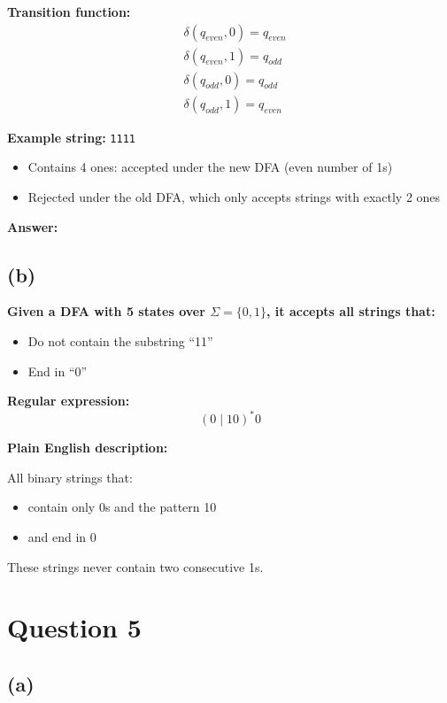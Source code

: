 \documentclass{article}
\begin{document}
\textbf{Transition function:}
\[
\begin{aligned}
&\delta(q_{even}, 0) = q_{even} \\
&\delta(q_{even}, 1) = q_{odd} \\
&\delta(q_{odd}, 0) = q_{odd} \\
&\delta(q_{odd}, 1) = q_{even}
\end{aligned}
\]

\textbf{Example string:} \texttt{1111}

\begin{itemize}
  \item Contains 4 ones: accepted under the new DFA (even number of 1s)
  \item Rejected under the old DFA, which only accepts strings with exactly 2 ones
\end{itemize}

\textbf{Answer:} 

\subsection*{(b)}

\textbf{Given a DFA with 5 states over \(\Sigma = \{0,1\}\), it accepts all strings that:}

\begin{itemize}
  \item Do not contain the substring “11”
  \item End in “0”
\end{itemize}

\textbf{Regular expression:}
\[
(0 \mid 10)^*0
\]

\textbf{Plain English description:}

All binary strings that:
\begin{itemize}
  \item contain only 0s and the pattern 10
  \item and end in 0
\end{itemize}

These strings never contain two consecutive 1s.

\section*{Question 5}

\subsection*{(a)}
\end{document}
